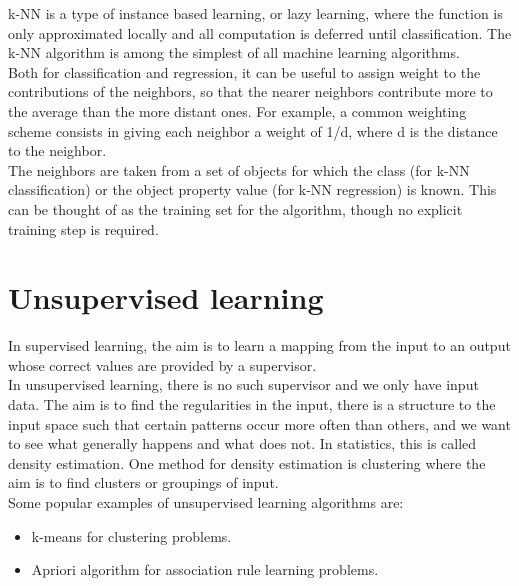 k-NN is a type of instance based learning, or lazy learning, where the function is only approximated locally and all computation is deferred until classification. The k-NN algorithm is among the simplest of all machine learning algorithms.\\ Both for classification and regression, it can be useful to assign weight to the contributions of the neighbors, so that the nearer neighbors contribute more to the average than the more distant ones. For example, a common weighting scheme consists in giving each neighbor a weight of 1/d, where d is the distance to the neighbor.\\ The neighbors are taken from a set of objects for which the class (for k-NN classification) or the object property value (for k-NN regression) is known. This can be thought of as the training set for the algorithm, though no explicit training step is required.



\section{Unsupervised learning}

In supervised learning, the aim is to learn a mapping from the input to
an output whose correct values are provided by a supervisor.\\
In unsupervised
learning, there is no such supervisor and we only have input data.
The aim is to find the regularities in the input, there is a structure to the
input space such that certain patterns occur more often than others, and we want to see what generally happens and what does not. In statistics, this is called density estimation.
One method for density estimation is clustering where the aim is to
find clusters or groupings of input.\\ 
Some popular examples of unsupervised learning algorithms are:


\begin{itemize}
  \item k-means for clustering problems.
  \item Apriori algorithm for association rule learning problems.
\end{itemize}


